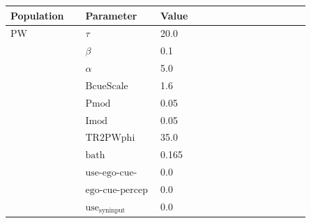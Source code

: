 \documentclass{article}
\begin{document}
\noindent
\begin{tabularx}{\linewidth}{|p{0.25\linewidth}|p{0.25\linewidth}|X|}\hline
\textbf{Population} & \textbf{Parameter} & \textbf{Value}   \\ \hline

    PW             & $\tau$        & 20.0  \\ \hline

                 & $\beta$        & 0.1  \\ \hline

                 & $\alpha$        & 5.0  \\ \hline

                 & ${\text{BcueScale}}$        & 1.6  \\ \hline

                 & ${\text{Pmod}}$        & 0.05  \\ \hline

                 & ${\text{Imod}}$        & 0.05  \\ \hline

                 & ${\text{TR2PWphi}}$        & 35.0  \\ \hline

                 & ${\text{bath}}$        & 0.165  \\ \hline

                 & ${\text{use-ego-cue-percep}}$        & 0.0  \\ \hline

                 & ${\text{ego-cue-percep}}$        & 0.0  \\ \hline

                 & ${\text{use}}_{\text{syninput}}$        & 0.0  \\ \hline

\end{tabularx}

\vspace{2ex}
\end{document}
